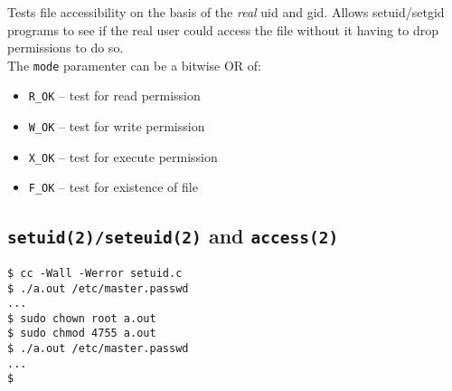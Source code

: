\documentclass[xga]{xdvislides}
\begin{document}
Tests file accessibility on the basis of the {\em real} uid and gid. Allows
setuid/setgid programs to see if the real user could access the file without
it having to drop permissions to do so.
\\

The {\tt mode} paramenter can be a bitwise OR of:

\begin{itemize}
	\item {\tt R\_OK} -- test for read permission
	\item {\tt W\_OK} -- test for write permission
	\item {\tt X\_OK} -- test for execute permission
	\item {\tt F\_OK} -- test for existence of file
\end{itemize}

\subsection{{\tt setuid(2)/seteuid(2)} and {\tt access(2)}}
\begin{verbatim}
$ cc -Wall -Werror setuid.c
$ ./a.out /etc/master.passwd
...
$ sudo chown root a.out
$ sudo chmod 4755 a.out
$ ./a.out /etc/master.passwd
...
$
\end{verbatim}
\end{document}
